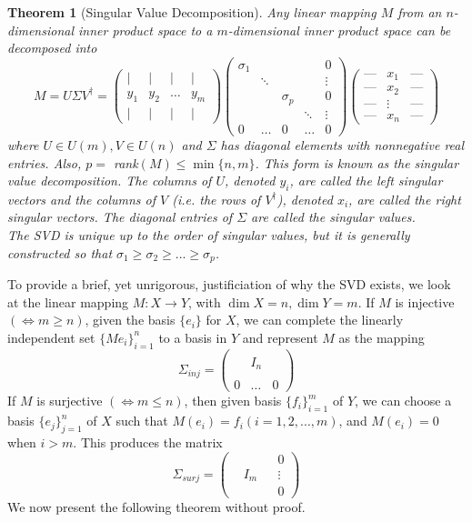 \documentclass{article}
\newtheorem{theorem}{Theorem}[section]
\theoremstyle{remark}
\theoremstyle{definition}
\begin{document}
\begin{theorem}[Singular Value Decomposition]
Any linear mapping $M$ from an $n$-dimensional inner product space to a $m$-dimensional inner product space can be decomposed into 
\[ M = U \Sigma V^\dagger = \begin{pmatrix}
 \vert & \vert & \vert & \vert\\
y_1 & y_2 & \ldots & y_m \\
\vert & \vert & \vert & \vert
\end{pmatrix}\begin{pmatrix}
\sigma_1 & & & &0\\
&\ddots &&& \vdots \\
& & \sigma_p & & 0\\
& & & \ddots &\vdots \\
0 & \ldots &0& \ldots &0
\end{pmatrix} \begin{pmatrix}
\text{---}&x_1&\text{---} \\
\text{---}&x_2&\text{---} \\
\text{---}&\vdots&\text{---} \\
\text{---}&x_n&\text{---}
\end{pmatrix} \]
where $U \in U(m), V \in U(n)$ and $\Sigma$ has diagonal elements with nonnegative real entries. Also, $p = $ rank$(M) \leq \min{\{n,m\}}$. This form is known as the \textit{singular value decomposition}. The columns of $U$, denoted $y_i$, are called the \textit{left singular vectors} and the columns of $V$ (i.e. the rows of $V^\dagger$), denoted $x_i$, are called the \textit{right singular vectors}. The diagonal entries of $\Sigma$ are called the \textit{singular values}. 
\\

The SVD is unique up to the order of singular values, but it is generally constructed so that $\sigma_1 \geq \sigma_2 \geq ... \geq \sigma_p$. 
\end{theorem}

To provide a brief, yet unrigorous, justificiation of why the SVD exists, we look at the linear mapping $M: X \longrightarrow Y$, with $\dim{X} = n, \dim{Y} = m$. If $M$ is injective $(\iff m \geq n)$, given the basis $\{e_i\}$ for $X$, we can complete the linearly independent set $\{Me_i\}_{i=1}^n$ to a basis in $Y$ and represent $M$ as the mapping
\[\Sigma_{inj} = \begin{pmatrix}
&&\\
&I_n&\\
&&\\
0&\ldots &0
\end{pmatrix}\]
If $M$ is surjective $(\iff m \leq n)$, then given basis $\{f_i\}_{i=1}^m$ of $Y$, we can choose a basis $\{e_j\}_{j=1}^n$ of $X$ such that $M(e_i) = f_i (i = 1, 2, ..., m)$, and $M(e_i) = 0$ when $i > m$. This produces the matrix
\[\Sigma_{surj} = \begin{pmatrix}
&&&0\\&I_m&& \vdots \\&&&0\end{pmatrix}\]
We now present the following theorem without proof. 
\end{document}
